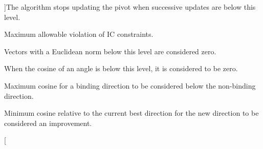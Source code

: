 \begin{Desc}
\begin{description}
{}]The algorithm stops updating the pivot when successive updates are below this level. \item[{\em 
\hypertarget{class_s_g_solver_a8c5a3d3ffb0b8344e24da63ea0b3e791acfc1ac35dad7908dd182b395c0256a17}{I\+C\+T\+O\+L}\label{class_s_g_solver_a8c5a3d3ffb0b8344e24da63ea0b3e791acfc1ac35dad7908dd182b395c0256a17}
}]Maximum allowable violation of I\+C constraints. \item[{\em 
\hypertarget{class_s_g_solver_a8c5a3d3ffb0b8344e24da63ea0b3e791a7df7080f029ef0b59493dee9b020c8b8}{N\+O\+R\+M\+T\+O\+L}\label{class_s_g_solver_a8c5a3d3ffb0b8344e24da63ea0b3e791a7df7080f029ef0b59493dee9b020c8b8}
}]Vectors with a Euclidean norm below this level are considered zero. \item[{\em 
\hypertarget{class_s_g_solver_a8c5a3d3ffb0b8344e24da63ea0b3e791a0469d84b8d9a560cfdb25b6c43229815}{F\+L\+A\+T\+T\+O\+L}\label{class_s_g_solver_a8c5a3d3ffb0b8344e24da63ea0b3e791a0469d84b8d9a560cfdb25b6c43229815}
}]When the cosine of an angle is below this level, it is considered to be zero. \item[{\em 
\hypertarget{class_s_g_solver_a8c5a3d3ffb0b8344e24da63ea0b3e791ace6ad6763f68822c5809a3a4247b9b42}{L\+E\+V\+E\+L\+T\+O\+L}\label{class_s_g_solver_a8c5a3d3ffb0b8344e24da63ea0b3e791ace6ad6763f68822c5809a3a4247b9b42}
}]Maximum cosine for a binding direction to be considered below the non-\/binding direction. \item[{\em 
\hypertarget{class_s_g_solver_a8c5a3d3ffb0b8344e24da63ea0b3e791a0c8efa0b4f9ba181f9daab92b678f19f}{I\+M\+P\+R\+O\+V\+E\+T\+O\+L}\label{class_s_g_solver_a8c5a3d3ffb0b8344e24da63ea0b3e791a0c8efa0b4f9ba181f9daab92b678f19f}
}]Minimum cosine relative to the current best direction for the new direction to be considered an improvement. \item[{\em 
}
\end{description}
\end{Desc}
